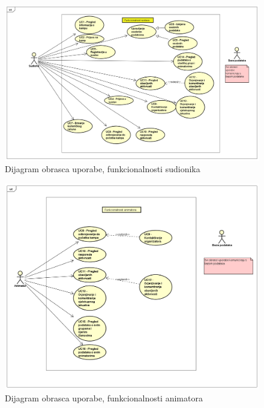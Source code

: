 				\begin{figure}[H]
				\centerline{\includegraphics[width=\textwidth]{slike/UC_sudionik.png}}
				\caption{Dijagram obrasca uporabe, funkcionalnosti sudionika}
				\label{fig:ucSudionik}
				\end{figure}
			
				\begin{figure}[H]
					\centerline{\includegraphics[width=\textwidth]{slike/UC_animator.png}}
					\caption{Dijagram obrasca uporabe, funkcionalnosti animatora}
					\label{fig:ucAnimator}
				\end{figure}
		
